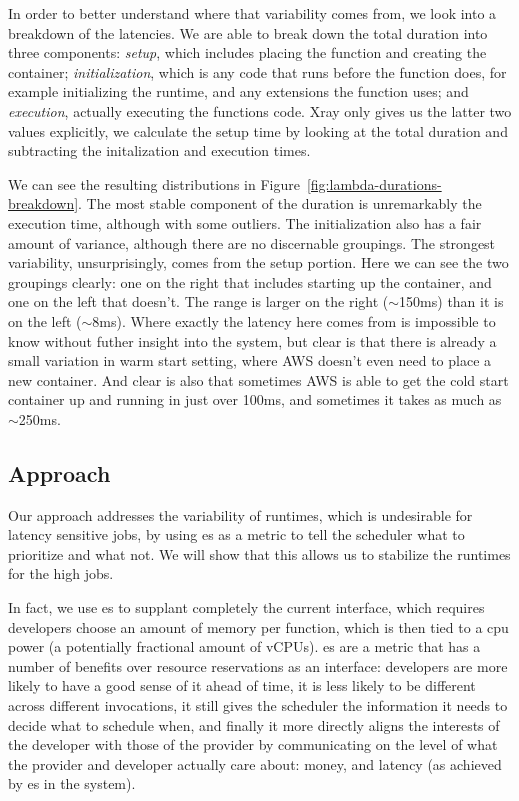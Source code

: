 In order to better understand where that variability comes from, we look into a
breakdown of the latencies. We are able to break down the total duration into
three components: \textit{setup}, which includes placing the function and
creating the container; \textit{initialization}, which is any code that runs
before the function does, for example initializing the runtime, and any
extensions the function uses; and \textit{execution}, actually executing the
functions code. Xray only gives us the latter two values explicitly, we
calculate the setup time by looking at the total duration and subtracting the
initalization and execution times. 

We can see the resulting distributions in
Figure~\ref{fig:lambda-durations-breakdown}. The most stable component of the
duration is unremarkably the execution time, although with some outliers. The
initialization also has a fair amount of variance, although there are no
discernable groupings. The strongest variability, unsurprisingly, comes from the
setup portion. Here we can see the two groupings clearly: one on the right that
includes starting up the container, and one on the left that doesn't. The range
is larger on the right ($\sim$150ms) than it is on the left ($\sim$8ms). Where
exactly the latency here comes from is impossible to know without futher insight
into the system, but clear is that there is already a small variation in warm
start setting, where AWS doesn't even need to place a new container. And clear
is also that sometimes AWS is able to get the cold start container up and
running in just over 100ms, and sometimes it takes as much as $\sim$250ms.

\subsection{Approach}

Our approach addresses the variability of runtimes, which is undesirable for
latency sensitive jobs, by using \priceclass{}es as a metric to tell the
scheduler what to prioritize and what not. We will show that this allows us to
stabilize the runtimes for the high \class{} jobs. 

In fact, we use \class{}es to supplant completely the current interface, which
requires developers choose an amount of memory per function, which is then tied
to a cpu power (a potentially fractional amount of vCPUs). \Priceclass{}es are a
metric that has a number of benefits over resource reservations as an interface:
developers are more likely to have a good sense of it ahead of time, it is less
likely to be different across different invocations, it still gives the
scheduler the information it needs to decide what to schedule when, and finally
it more directly aligns the interests of the developer with those of the
provider by communicating on the level of what the provider and developer
actually care about: money, and latency (as achieved by \class{}es in the
system).


